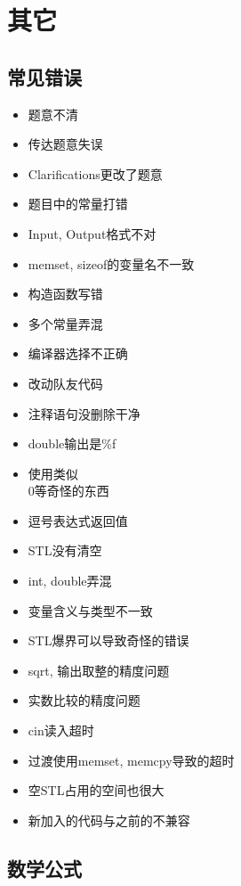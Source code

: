 \documentclass{article}
\begin{document}
\section{其它}

\subsection{常见错误}

\begin{itemize}
    \item 题意不清
    \item 传达题意失误
    \item Clarifications更改了题意

    \item 题目中的常量打错
    \item Input, Output格式不对
    \item memset, sizeof的变量名不一致
    \item 构造函数写错
    \item 多个常量弄混
    \item 编译器选择不正确
    \item 改动队友代码
    \item 注释语句没删除干净

    \item double输出是\%f
    \item 使用类似\\0等奇怪的东西
    \item 逗号表达式返回值

    \item STL没有清空
    \item int, double弄混
    \item 变量含义与类型不一致
    \item STL爆界可以导致奇怪的错误

    \item sqrt, 输出取整的精度问题
    \item 实数比较的精度问题

    \item cin读入超时
    \item 过渡使用memset, memcpy导致的超时
    \item 空STL占用的空间也很大

    \item 新加入的代码与之前的不兼容
\end{itemize}

\subsection{数学公式}
\end{document}
